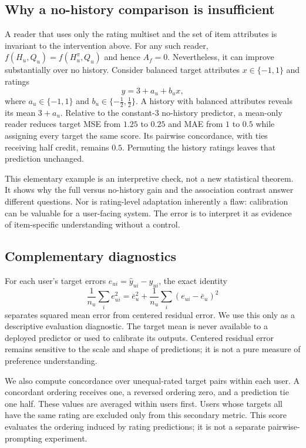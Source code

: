 \documentclass{article}
\begin{document}
\subsection{Why a no-history comparison is insufficient}
A reader that uses only the rating multiset and the set of item attributes is invariant to the intervention above. For any such reader, $f(H_u,Q_u)=f(H_u^\pi,Q_u)$ and hence $A_f=0$. Nevertheless, it can improve substantially over no history. Consider balanced target attributes $x\in\{-1,1\}$ and ratings
\begin{equation}
 y=3+a_u+b_u x,
\end{equation}
where $a_u\in\{-1,1\}$ and $b_u\in\{-\tfrac12,\tfrac12\}$. A history with balanced attributes reveals its mean $3+a_u$. Relative to the constant-3 no-history predictor, a mean-only reader reduces target MSE from $1.25$ to $0.25$ and MAE from $1$ to $0.5$ while assigning every target the same score. Its pairwise concordance, with ties receiving half credit, remains $0.5$. Permuting the history ratings leaves that prediction unchanged.

This elementary example is an interpretive check, not a new statistical theorem. It shows why the full versus no-history gain and the association contrast answer different questions. Nor is rating-level adaptation inherently a flaw: calibration can be valuable for a user-facing system. The error is to interpret it as evidence of item-specific understanding without a control.

\subsection{Complementary diagnostics}
For each user's target errors $e_{ui}=\hat y_{ui}-y_{ui}$, the exact identity
\begin{equation}
 \frac1{n_u}\sum_i e_{ui}^2
 =\bar e_u^2+\frac1{n_u}\sum_i(e_{ui}-\bar e_u)^2
 \label{eq:decomposition}
\end{equation}
separates squared mean error from centered residual error. We use this only as a descriptive evaluation diagnostic. The target mean is never available to a deployed predictor or used to calibrate its outputs. Centered residual error remains sensitive to the scale and shape of predictions; it is not a pure measure of preference understanding.

We also compute concordance over unequal-rated target pairs within each user. A concordant ordering receives one, a reversed ordering zero, and a prediction tie one half. These values are averaged within users first. Users whose targets all have the same rating are excluded only from this secondary metric. This score evaluates the ordering induced by rating predictions; it is not a separate pairwise-prompting experiment.
\end{document}
